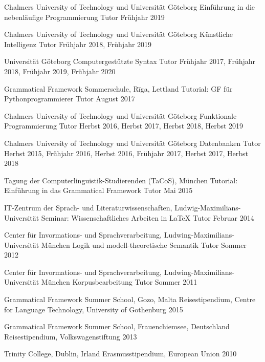 \documentclass[11pt, a4]{academic-cv}
\begin{document}
\begin{cventries}
\cventry
{Chalmers University of Technology und Universität Göteborg}
{Einführung in die nebenläufige Programmierung}
{Tutor}
{}
{Frühjahr 2019}

\cventry
{Chalmers University of Technology und Universität Göteborg}
{Künstliche Intelligenz}
{Tutor}
{}
{Frühjahr 2018, Frühjahr 2019}

\cventry
{Universität Göteborg}
{Computergestützte Syntax}
{Tutor}
{}
{Frühjahr 2017, Frühjahr 2018, Frühjahr 2019, Frühjahr 2020}

\cventry
{Grammatical Framework Sommerschule, Rīga, Lettland}
{Tutorial: GF für Pythonprogrammierer}
{Tutor}
{}
{August 2017}

\cventry
{Chalmers University of Technology und Universität Göteborg}
{Funktionale Programmierung}
{Tutor}
{}
{Herbst 2016, Herbst 2017, Herbst 2018, Herbst 2019}

\cventry
{Chalmers University of Technology und Universität Göteborg}
{Datenbanken}
{Tutor}
{}
{Herbst 2015, Frühjahr 2016, Herbst 2016, Frühjahr 2017, Herbst 2017, Herbst 2018}

\cventry
{Tagung der Computerlinguistik-Studierenden (TaCoS), München}
{Tutorial: Einführung in das Grammatical Framework}
{Tutor}
{}
{Mai 2015}

\cventry
{IT-Zentrum der Sprach- und Literaturwissenschaften, Ludwig-Maximilians-Universität}
{Seminar: Wissenschaftliches Arbeiten in LaTeX}
{Tutor}
{}
{Februar 2014}

\cventry
{Center für Invormations- und Sprachverarbeitung, Ludwing-Maximilians-Universität München}
{Logik und modell-theoretische Semantik}
{Tutor}
{}
{Sommer 2012}

\cventry
{Center für Invormations- und Sprachverarbeitung, Ludwing-Maximilians-Universität München}
{Korpusbearbeitung}
{Tutor}
{}
{Sommer 2011}

\end{cventries}
\vspace{-10px}

\begin{cvhonors}
\cvhonor
{Grammatical Framework Summer School, Gozo, Malta}
{\newline
Reisestipendium, Centre for Language Technology, University of Gothenburg}
{}
{2015}

\cvhonor
{Grammatical Framework Summer School, Frauenchiemsee, Deutschland}
{\newline
Reisestipendium, Volkswagenstiftung}
{}
{2013}

\cvhonor
{Trinity College, Dublin, Irland}
{\newline
Erasmusstipendium, European Union}
{}
{2010}
\end{cvhonors}
\vspace{-10px}
\end{document}
